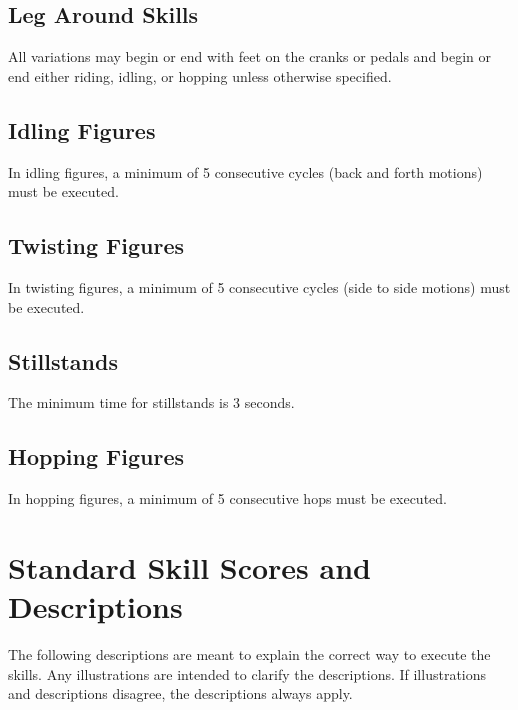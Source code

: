 \subsection{Leg Around Skills}
All variations may begin or end with feet on the cranks or pedals and begin or end either riding, idling, or hopping unless otherwise specified.

\subsection{Idling Figures}
In idling figures, a minimum of 5 consecutive cycles (back and forth motions) must be executed.

\subsection{Twisting Figures}
In twisting figures, a minimum of 5 consecutive cycles (side to side motions) must be executed.

\subsection{Stillstands}
The minimum time for stillstands is 3 seconds.

\subsection{Hopping Figures}
In hopping figures, a minimum of 5 consecutive hops must be executed.

\section{Standard Skill Scores and Descriptions}
The following descriptions are meant to explain the correct way to execute the skills.
Any illustrations are intended to clarify the descriptions.
If illustrations and descriptions disagree, the descriptions always apply.


